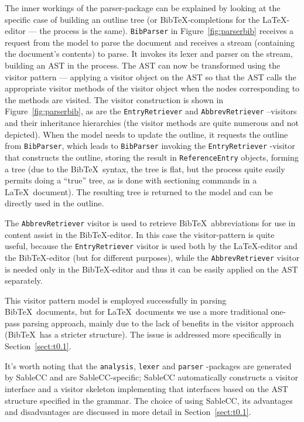 \documentclass[a4paper,11pt,twoside]{article}
\begin{document}
The inner workings of the parser-package can be explained by looking at the 
specific case of building an outline tree (or Bib\TeX -completions for the 
\LaTeX -editor --- the process is the same). \texttt{BibParser} in 
Figure~\ref{fig:parserbib} receives a request from the model to parse the 
document and receives a stream (containing the document's contents) to parse. 
It invokes its lexer and parser on the stream, building an AST in the process. 
The AST can now be transformed using the visitor pattern --- applying a visitor 
object on the AST so that the AST calls the appropriate visitor methods of the 
visitor object when the nodes corresponding to the methods are visited. The 
visitor construction is shown in Figure~\ref{fig:parserbib}, as are the 
\texttt{EntryRetriever} and \texttt{AbbrevRetriever} --visitors and their 
inheritance hierarchies (the visitor methods are quite numerous and not 
depicted). When the model needs to update the outline, it requests the outline 
from \texttt{BibParser}, which leads to \texttt{BibParser} invoking the 
\texttt{EntryRetriever} -visitor that constructs the outline, storing the 
result in \texttt{ReferenceEntry} objects, forming a tree (due to the Bib\TeX\ 
syntax, the tree is flat, but the process quite easily permits doing a ``true'' 
tree, as is done with sectioning commands in a \LaTeX\ document). The resulting 
tree is returned to the model and can be directly used in the outline.

The \texttt{AbbrevRetriever} visitor is used to retrieve Bib\TeX\
abbreviations for use in content assist in the Bib\TeX -editor. In this case the
visitor-pattern is quite useful, because the \texttt{EntryRetriever} visitor is
used both by the \LaTeX -editor and the Bib\TeX -editor (but for different
purposes), while the \texttt{AbbrevRetriever} visitor is needed only in the
Bib\TeX -editor and thus it can be easily applied on the AST separately.

This visitor pattern model is employed successfully in parsing Bib\TeX\
documents, but for \LaTeX\ documents we use a more traditional one-pass
parsing approach, mainly due to the lack of benefits in the visitor
approach (Bib\TeX\ has a stricter structure). The issue is
addressed more specifically in Section~\ref{sect:t0.1}.

It's worth noting that the \texttt{analysis}, \texttt{lexer} and
\texttt{parser} -packages are generated by SableCC and are
SableCC-specific; SableCC automatically constructs a visitor interface
and a visitor skeleton implementing that interfaces based on the AST
structure specified in the grammar. The choice of using SableCC, its
advantages and disadvantages are discussed in more detail in
Section~\ref{sect:t0.1}.
\end{document}
